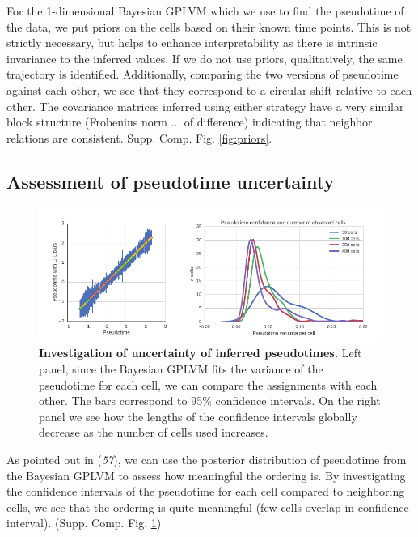 For the 1-dimensional Bayesian GPLVM which we use to find the pseudotime of the data, we put priors on the cells based on their known time points. This is not strictly necessary, but helps to enhance interpretability as there is intrinsic invariance to the inferred values. If we do not use priors, qualitatively, the same trajectory is identified. Additionally, comparing the two versions of pseudotime against each other, we see that they correspond to a circular shift relative to each other. The covariance matrices inferred using either strategy have a very similar block structure (Frobenius norm ... of difference) indicating that 
neighbor relations are consistent. Supp. Comp. Fig. \ref{fig:priors}.

\subsection{Assessment of pseudotime uncertainty}

\begin{figure}
    \centering
    \includegraphics[width=\textwidth]{"pseudotime-uncertainty"}
    \caption[Investigation of uncertainty of inferred pseudotimes]{\textbf{Investigation of uncertainty of inferred pseudotimes.} Left panel, since the Bayesian GPLVM fits the variance of the pseudotime for each cell, we can compare the assignments with each other. The bars correspond to 95\% confidence intervals. On the right panel we see how the lengths of the confidence intervals globally decrease as the number of cells used increases.}
    \label{fig:pseudotime-certainty}
\end{figure}

As pointed out in ({\it 57}), we can use the posterior distribution of pseudotime from the Bayesian GPLVM to assess how meaningful the ordering is. By investigating the confidence intervals of the pseudotime for each cell compared to neighboring cells, we see that the ordering is quite meaningful (few cells overlap in confidence interval). (Supp. Comp. Fig. \ref{fig:pseudotime-certainty})

